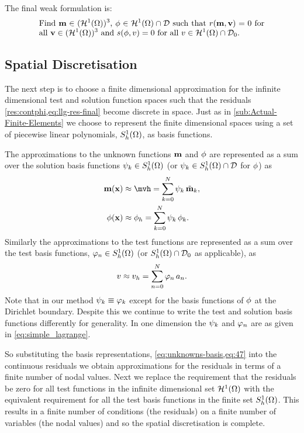 {The final weak formulation is:
\begin{equation}
  \eqpar{Find $\mv \in (\tsinf)^3$, $\phim \in \tsinf \cap \Dfs$ such that $\rllg(\mv, \testv) = 0$ for all $\testv \in (\tsinf)^3$ and $\rphi(\phim, \test) = 0$ for all $\test \in \tsinf \cap \Dfs_0$.}
\label{eq:inf-dim-problem}
\end{equation}




\subsection{Spatial Discretisation}
\label{sec:spat-discr-resi}

The next step is to choose a finite dimensional approximation for the infinite dimensional test and solution function spaces such that the residuals \cref{res:contphi,eq:llg-res-final} become discrete in space.
Just as in \cref{sub:Actual-Finite-Elements} we choose to represent the finite dimensional spaces using a set of piecewise linear polynomials, ${S_h^1(\Omega)}$, as basis functions.

The approximations to the unknown functions $\boldsymbol{\mathrm{m}}$ and $\phi$ are represented as a sum over the solution basis functions ${\psi_k} \in {S_h^1(\Omega)}$ (or ${\psi_k} \in {S_h^1(\Omega)} \cap \mathcal{D}$ for $\phi$) as
\begin{equation}
  \begin{aligned}
    \mv(\xv) &\approx \mvh = \sum_{k = 0}^{N} \sk \, \mvdis_k, \\
    \phim(\xv) &\approx \phimh = \sum_{k = 0}^{N} \sk \, \phim_{k}.
    \label{eq:unknowns-basis}
  \end{aligned}
\end{equation}
Similarly the approximations to the test functions are represented as a sum over the test basis functions, ${\varphi_n} \in {S_h^1(\Omega)}$ (or ${S_h^1(\Omega)} \cap \mathcal{D}_0$ as applicable), as
\begin{equation}
  \label{eq:47}
  v \approx {v}_h = \sum_{n = 0}^{N} {\varphi_n} \, a_n.
\end{equation}
Note that in our method $\psi_k \equiv \varphi_k$ except for the basis functions of  $\phi$ at the Dirichlet boundary.
Despite this we continue to write the test and solution basis functions differently for generality.
In one dimension the ${\psi_k}$ and ${\varphi_n}$ are as given in \cref{eq:simple_lagrange}.

So substituting the basis representations, \cref{eq:unknowns-basis,eq:47} into the continuous residuals we obtain approximations for the residuals in terms of a finite number of nodal values.
Next we replace the requirement that the residuals be zero for all test functions in the infinite dimensional set ${\mathcal{H}^1(\Omega)}$ with the equivalent requirement for all the test basis functions in the finite set ${S_h^1(\Omega)}$.
This results in a finite number of conditions (the residuals) on a finite number of variables (the nodal values) and so the spatial discretisation is complete.

}

